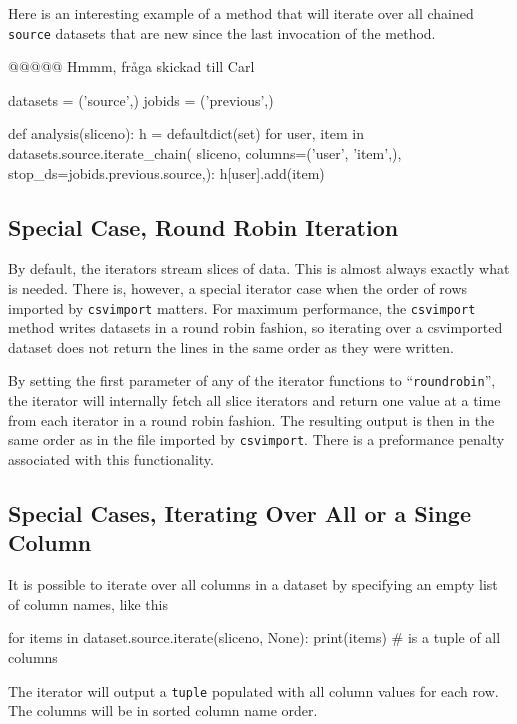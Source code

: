 Here is an interesting example of a method that will iterate over all
chained \texttt{source} datasets that are new since the last
invocation of the method.

@@@@@  Hmmm, fråga skickad till Carl

\begin{python}
datasets = ('source',)
jobids = ('previous',)

def analysis(sliceno):
    h = defaultdict(set)
    for user, item in datasets.source.iterate_chain(
                           sliceno, columns=('user', 'item',),
                           stop_ds=jobids.previous.source,):
        h[user].add(item)
\end{python}



\subsection{Special Case, Round Robin Iteration}
By default, the iterators stream slices of data.  This is almost
always exactly what is needed.  There is, however, a special iterator
case when the order of rows imported by \texttt{csvimport} matters.
For maximum performance, the \texttt{csvimport} method writes datasets
in a round robin fashion, so iterating over a csvimported dataset does
not return the lines in the same order as they were written.

By setting the first parameter of any of the iterator functions to
``\texttt{roundrobin}'', the iterator will internally fetch all slice iterators
and return one value at a time from each iterator in a round robin
fashion.  The resulting output is then in the same order as in the
file imported by \texttt{csvimport}.  There is a preformance penalty
associated with this functionality.



\subsection{Special Cases, Iterating Over All or a Singe Column}
It is possible to iterate over all columns in a dataset by specifying
an empty list of column names, like this
\begin{python}
for items in dataset.source.iterate(sliceno, None):
    print(items)  # is a tuple of all columns
\end{python}
The iterator will output a \texttt{tuple} populated with all column
values for each row.  The columns will be in sorted column name order.

